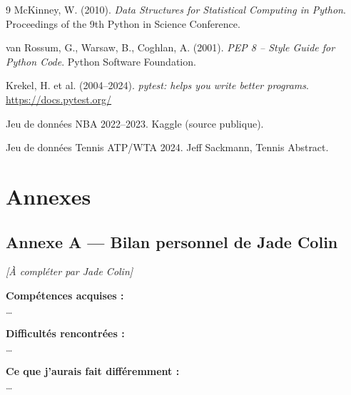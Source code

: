 \documentclass[12pt,a4paper]{article}
\begin{document}
\newpage
\begin{thebibliography}{9}
    McKinney, W. (2010).
    \textit{Data Structures for Statistical Computing in Python}.
    Proceedings of the 9th Python in Science Conference.

    van Rossum, G., Warsaw, B., Coghlan, A. (2001).
    \textit{PEP 8 -- Style Guide for Python Code}.
    Python Software Foundation.

    Krekel, H. et al. (2004--2024).
    \textit{pytest: helps you write better programs}.
    \url{https://docs.pytest.org/}

    Jeu de données NBA 2022--2023.
    Kaggle (source publique).

    Jeu de données Tennis ATP/WTA 2024.
    Jeff Sackmann, Tennis Abstract.
\end{thebibliography}

\newpage
\appendix
\section*{Annexes}

\subsection*{Annexe A --- Bilan personnel de Jade Colin}

\begin{tcolorbox}[colback=gray!5, colframe=gray!50, title=Bilan personnel]
  \textit{[À compléter par Jade Colin]}

  \medskip
  \textbf{Compétences acquises :} \\
  \ldots

  \medskip
  \textbf{Difficultés rencontrées :} \\
  \ldots

  \medskip
  \textbf{Ce que j'aurais fait différemment :} \\
  \ldots
\end{tcolorbox}
\end{document}
